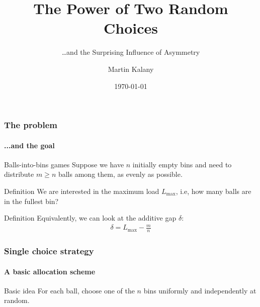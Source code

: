 \documentclass[serif,professionalfonts]{beamer}
\title{The Power of Two Random Choices}
\subtitle{\dots and the Surprising Influence of Asymmetry}
\author[M. Kalany]{Martin Kalany}
\institute[TU Wien]
{
  Graduate student in Computer Science\\
  Vienna University of Technology\\
}
\date{\today}
\newcommand\load{L_{\mathrm{max}}}
\newcommand\scalefac{0.55}
\newcommand\ballsize{5mm}
\newcommand\nrbins{6}
\newcommand\padding{0.1*\ballsize}
\newcommand\bingap{1.6*\balldiameter}
\newcommand\balldiameter{2*\ballsize}
\newcommand\iA[2][0]{
	\path (\nbid) edge[insert, bend left=#1] (#2);
}
\newcommand\bin[1]{
	\path node[topflat, xshift=#1*\bingap*\scalefac, above, yshift=-\padding*\scalefac]  {};
}
\newcommand\bins{
	\foreach \ibin in {1,...,\nrbins}
		\bin{\ibin};
}
\newcommand\setNode[2]{
	\draw let \n1 ={#1#2} in node[circle, minimum size = \ballsize](n\n1) at (#1*\bingap,#2*\balldiameter-\ballsize) {};
}
\newcommand\nodes{
	\foreach \i in {1,...,6}
		\foreach \j in {1,...,5}
			\setNode{\i}{\j};
}
\newcommand\ball[2]{
	\shade[ballstyle] (#1*\bingap,#2*\balldiameter-\ballsize) circle (\ballsize) {};
}
\newcommand\nbid{nb}
\newcommand\newball{
	\draw node[circle, minimum size = \ballsize](\nbid) at (0*\bingap,6*\balldiameter-\ballsize) {};
	\ball{0}{6};
}
\newcommand\putinbin[2]{
	\ifnum #2 > 0
		\foreach \nrballs in {1,...,#2}
 			\ball{#1}{\nrballs};
 	\fi
}
\newcounter{index}
\newcommand\balls[1]{%
	\getargsC{#1}%
  	\setcounter{index}{0}%
  	\whiledo{\theindex < \narg}{%
    		\stepcounter{index}%
    		\putinbin{\theindex}{\csname arg\romannumeral\theindex\endcsname}%
  	}%
}
\newcommand\bab[1]{%
	\bins
	\nodes
	\balls{#1}
}
\begin{document}
\begin{frame}
  \titlepage
\end{frame}

\begin{frame}
\frametitle{The problem}
\framesubtitle{...and the goal}
\begin{exampleblock}{Balls-into-bins games}
Suppose we have $n$ initially empty bins and need to distribute $m \geq n$ balls among them, \alert{as evenly as possible}. 
\end{exampleblock}
\pause
\begin{exampleblock}{Definition}
We are interested in the \alert{maximum load $\load$}, i.e, how many balls are in the fullest bin?
\end{exampleblock}

\begin{exampleblock}{Definition}
Equivalently, we can look at the \alert{additive gap} $\delta$:
\begin{align*}
\delta = \load - \frac{m}{n}
\end{align*}
\end{exampleblock}
\end{frame}

\begin{frame}
\frametitle{Single choice strategy}
\framesubtitle{A basic allocation scheme}
\begin{exampleblock}{Basic idea}
For each ball, choose one of the $n$ bins \alert{uniformly and independently at random}.
\end{exampleblock}
\bigskip

\begin{center}
\end{center}
\end{frame}
\end{document}
